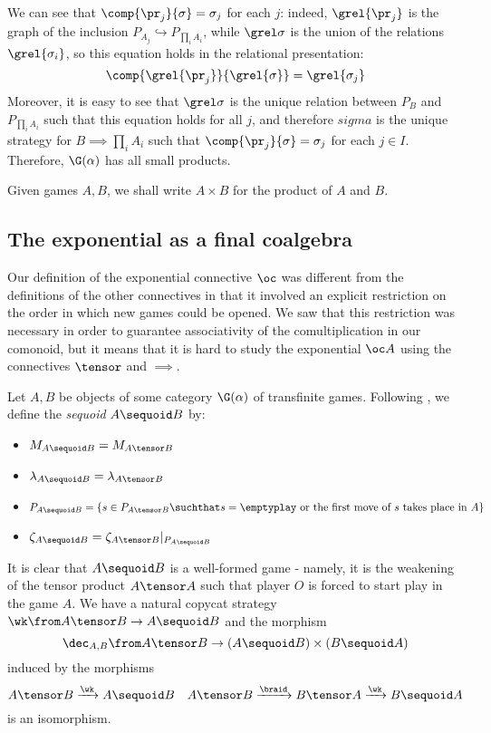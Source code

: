 \documentclass[11pt]{article} %
\begin{document}
We can see that $\comp{\pr_j}{\sigma}=\sigma_j$ for each $j$: indeed, $\grel{\pr_j}$ is the graph of the inclusion $P_{A_j}\hookrightarrow P_{\prod_i A_i}$, while $\grel\sigma$ is the union of the relations $\grel{\sigma_i}$, so this equation holds in the relational presentation:
\[
  \comp{\grel{\pr_j}}{\grel{\sigma}}=\grel{\sigma_j}
  \]
Moreover, it is easy to see that $\grel\sigma$ is the unique relation between $P_B$ and $P_{\prod_i A_i}$ such that this equation holds for all $j$, and therefore $sigma$ is the unique strategy for $B\implies\prod_i A_i$ such that $\comp{\pr_j}{\sigma}=\sigma_j$ for each $j\in I$.  Therefore, $\G(\alpha)$ has all small products.  

Given games $A,B$, we shall write $A\times B$ for the product of $A$ and $B$.

\subsection{The exponential as a final coalgebra}

Our definition of the exponential connective $\oc$ was different from the definitions of the other connectives in that it involved an explicit restriction on the order in which new games could be opened.  We saw that this restriction was necessary in order to guarantee associativity of the comultiplication in our comonoid, but it means that it is hard to study the exponential $\oc A$ using the connectives $\tensor$ and $\implies$.  

Let $A,B$ be objects of some category $\G(\alpha)$ of transfinite games.  Following \cite{laird02}, we define the \emph{sequoid} $A\sequoid B$ by:

\begin{itemize}
  \item $M_{A\sequoid B} = M_{A\tensor B}$
  \item $\lambda_{A\sequoid B}=\lambda_{A\tensor B}$
  \item $P_{A\sequoid B} = \{s\in P_{A\tensor B}\suchthat\textrm{$s=\emptyplay$ or the first move of $s$ takes place in $A$}\}$
  \item $\zeta_{A\sequoid B} = \zeta_{A\tensor B}\vert_{P_{A\sequoid B}}$
\end{itemize}

It is clear that $A\sequoid B$ is a well-formed game - namely, it is the weakening of the tensor product $A\tensor A$ such that player $O$ is forced to start play in the game $A$.  We have a natural copycat strategy $\wk\from A\tensor B\to A\sequoid B$ and the morphism
\[
  \dec_{A,B}\from A\tensor B\to (A\sequoid B)\times(B\sequoid A)
  \]
induced by the morphisms
\[
  A\tensor B\xrightarrow{\wk}A\sequoid B\quad A\tensor B\xrightarrow{\braid}B\tensor A\xrightarrow{\wk}B\sequoid A
  \]
is an isomorphism.
\end{document}
